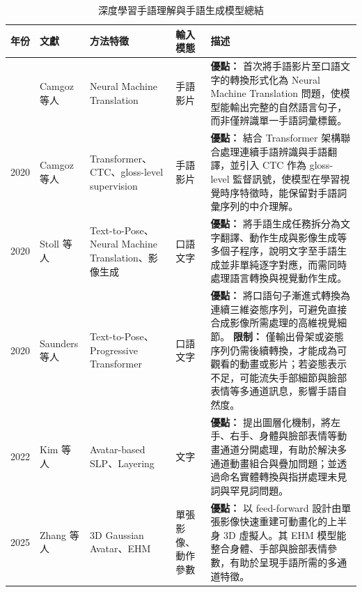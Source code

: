 \documentclass[class=NCU_thesis, crop=false]{standalone}
\begin{document}
\begin{table}[htbp]
\centering
\caption{深度學習手語理解與手語生成模型總結}
\label{tab:slp_summary}
\renewcommand{\arraystretch}{1.35}
\small
\begin{tabularx}{\textwidth}{
    >{\centering\arraybackslash}p{}
    >{\centering\arraybackslash}p{}
    >{\centering\arraybackslash}p{}
    >{\centering\arraybackslash}p{}
    X
}
\toprule
年份 & 文獻 & 方法特徵 & 輸入模態 & 描述 \\
\midrule

2018 &
Camgoz 等人 \cite{Camgoz_2018_CVPR} &
Neural Machine Translation &
手語影片 &
\textbf{優點：} 首次將手語影片至口語文字的轉換形式化為 Neural Machine Translation 問題，使模型能輸出完整的自然語言句子，而非僅辨識單一手語詞彙標籤。 \\

\midrule

2020 &
Camgoz 等人 \cite{Camgoz_2020_CVPR} &
Transformer、CTC、gloss-level supervision &
手語影片 &
\textbf{優點：} 結合 Transformer 架構聯合處理連續手語辨識與手語翻譯，並引入 CTC 作為 gloss-level 監督訊號，使模型在學習視覺時序特徵時，能保留對手語詞彙序列的中介理解。 \\

\midrule

2020 &
Stoll 等人 \cite{stoll2020text2sign} &
Text-to-Pose、Neural Machine Translation、影像生成 &
口語文字 &
\textbf{優點：} 將手語生成任務拆分為文字翻譯、動作生成與影像生成等多個子程序，說明文字至手語生成並非單純逐字對應，而需同時處理語言轉換與視覺動作生成。 \\

\midrule

2020 &
Saunders 等人 \cite{saunders2020progressivetransformers} &
Text-to-Pose、Progressive Transformer &
口語文字 &
\textbf{優點：} 將口語句子漸進式轉換為連續三維姿態序列，可避免直接合成影像所需處理的高維視覺細節。
\newline
\textbf{限制：} 僅輸出骨架或姿態序列仍需後續轉換，才能成為可觀看的動畫或影片；若姿態表示不足，可能流失手部細節與臉部表情等多通道訊息，影響手語自然度。 \\

\midrule

2022 &
Kim 等人 \cite{kim2022sign} &
Avatar-based SLP、Layering &
文字 &
\textbf{優點：} 提出圖層化機制，將左手、右手、身體與臉部表情等動畫通道分開處理，有助於解決多通道動畫組合與疊加問題；並透過命名實體轉換與指拼處理未見詞與罕見詞問題。 \\

\midrule

2025 &
Zhang 等人 \cite{zhang2025guava} &
3D Gaussian Avatar、EHM &
單張影像、動作參數 &
\textbf{優點：} 以 feed-forward 設計由單張影像快速重建可動畫化的上半身 3D 虛擬人。其 EHM 模型能整合身體、手部與臉部表情參數，有助於呈現手語所需的多通道特徵。 \\

\bottomrule
\end{tabularx}
\end{table}
\end{document}
